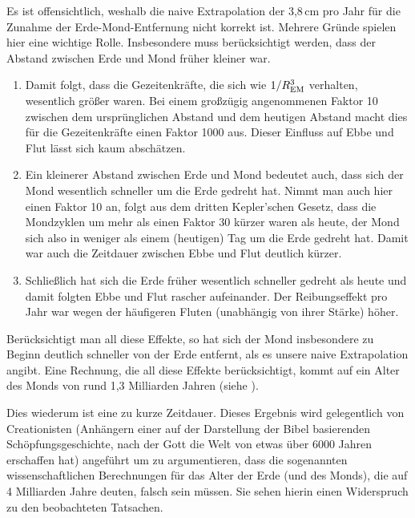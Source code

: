 Es ist offensichtlich, weshalb die naive Extrapolation der 3,8\,cm pro Jahr f\"ur die Zunahme
der Erde-Mond-Entfernung nicht korrekt ist. Mehrere Gr\"unde spielen hier eine wichtige Rolle.
Insbesondere muss ber\"ucksichtigt werden, dass der Abstand zwischen Erde und Mond
fr\"uher kleiner war. 
\begin{enumerate}
\item
Damit folgt, dass die Gezeitenkr\"afte, die sich wie $1/R_{\rm EM}^3$ verhalten, wesentlich
gr\"o\ss er waren. Bei einem gro\ss z\"ugig angenommenen Faktor 10 zwischen dem urspr\"unglichen
Abstand und dem heutigen Abstand macht dies f\"ur die Gezeitenkr\"afte einen Faktor 1000 aus. 
Dieser Einfluss auf Ebbe und Flut l\"asst sich kaum absch\"atzen.
\item
Ein kleinerer Abstand zwischen Erde und Mond bedeutet auch, dass sich der Mond wesentlich
schneller um die Erde gedreht hat. Nimmt man auch hier einen Faktor 10 an, folgt aus dem dritten
Kepler'schen Gesetz, dass die Mondzyklen um mehr als einen Faktor 30 k\"urzer waren als heute,
der Mond sich also in weniger als einem (heutigen) Tag um die Erde gedreht hat. Damit war
auch die Zeitdauer zwischen Ebbe und Flut deutlich k\"urzer.
\item
Schlie\ss lich hat sich die Erde fr\"uher wesentlich schneller gedreht als heute und damit
folgten Ebbe und Flut rascher aufeinander. Der Reibungseffekt pro Jahr war wegen der
h\"aufigeren Fluten (unabh\"angig von ihrer St\"arke) h\"oher.
\end{enumerate} 
Ber\"ucksichtigt man all diese Effekte, so hat sich der Mond insbesondere zu Beginn deutlich
schneller von der Erde entfernt, als es unsere naive Extrapolation angibt. Eine Rechnung, die
all diese Effekte ber\"ucksichtigt, kommt auf ein Alter des Monds von rund 1,3 Milliarden 
Jahren (siehe \cite{??}).

Dies wiederum ist eine zu kurze Zeitdauer. Dieses Ergebnis wird gelegentlich von Creationisten
(Anh\"angern einer auf der Darstellung der Bibel basierenden Sch\"opfungsgeschichte, nach der
Gott die Welt von etwas \"uber 6000 Jahren erschaffen hat) angef\"uhrt um zu argumentieren, dass
die sogenannten wissenschaftlichen Berechnungen f\"ur das Alter der Erde (und des Monds), die 
auf 4 Milliarden Jahre deuten, falsch sein m\"ussen. 
Sie sehen hierin einen Widerspruch zu den beobachteten Tatsachen.

